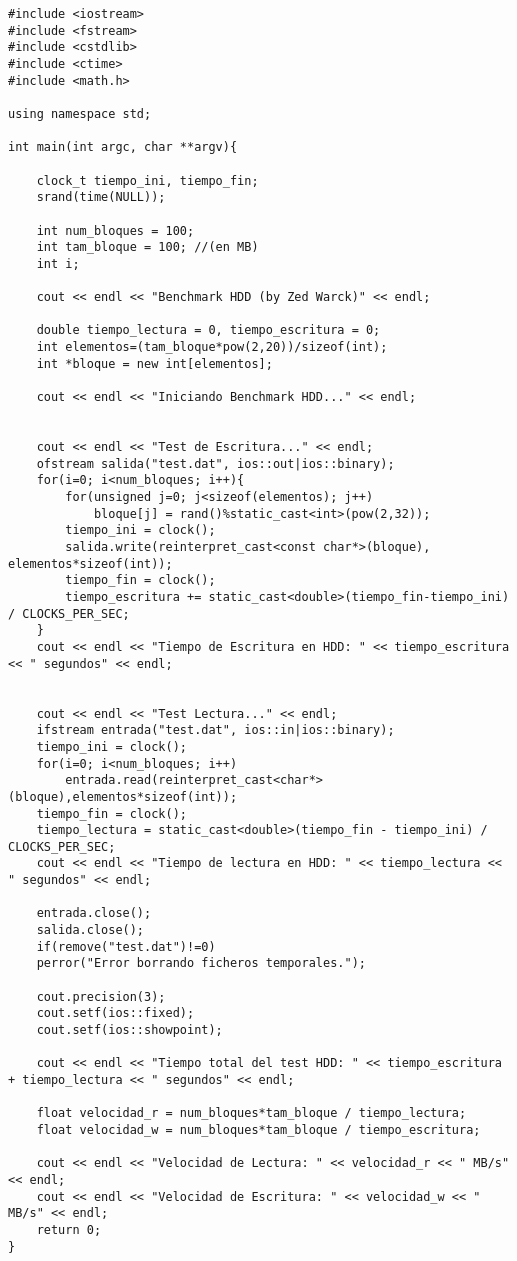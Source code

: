 \begin{lstlisting}[style=C]
#include <iostream>
#include <fstream>
#include <cstdlib>
#include <ctime>
#include <math.h>

using namespace std;

int main(int argc, char **argv){

	clock_t tiempo_ini, tiempo_fin;
	srand(time(NULL));

	int num_bloques = 100;
	int tam_bloque = 100; //(en MB)
	int i;

	cout << endl << "Benchmark HDD (by Zed Warck)" << endl;

	double tiempo_lectura = 0, tiempo_escritura = 0;
	int elementos=(tam_bloque*pow(2,20))/sizeof(int);
	int *bloque = new int[elementos];

	cout << endl << "Iniciando Benchmark HDD..." << endl;


	cout << endl << "Test de Escritura..." << endl;
	ofstream salida("test.dat", ios::out|ios::binary);
	for(i=0; i<num_bloques; i++){
		for(unsigned j=0; j<sizeof(elementos); j++)
			bloque[j] = rand()%static_cast<int>(pow(2,32));
		tiempo_ini = clock();
		salida.write(reinterpret_cast<const char*>(bloque), elementos*sizeof(int));
		tiempo_fin = clock();
		tiempo_escritura += static_cast<double>(tiempo_fin-tiempo_ini) / CLOCKS_PER_SEC;
	}
	cout << endl << "Tiempo de Escritura en HDD: " << tiempo_escritura << " segundos" << endl;
	
	
	cout << endl << "Test Lectura..." << endl;
	ifstream entrada("test.dat", ios::in|ios::binary);
	tiempo_ini = clock();
	for(i=0; i<num_bloques; i++)
		entrada.read(reinterpret_cast<char*>(bloque),elementos*sizeof(int));
	tiempo_fin = clock();
	tiempo_lectura = static_cast<double>(tiempo_fin - tiempo_ini) / CLOCKS_PER_SEC;
	cout << endl << "Tiempo de lectura en HDD: " << tiempo_lectura << " segundos" << endl;
	
	entrada.close();
	salida.close();
	if(remove("test.dat")!=0)
	perror("Error borrando ficheros temporales.");
	
	cout.precision(3);
	cout.setf(ios::fixed);
	cout.setf(ios::showpoint);

	cout << endl << "Tiempo total del test HDD: " << tiempo_escritura + tiempo_lectura << " segundos" << endl;
	
	float velocidad_r = num_bloques*tam_bloque / tiempo_lectura;
	float velocidad_w = num_bloques*tam_bloque / tiempo_escritura;
	
	cout << endl << "Velocidad de Lectura: " << velocidad_r << " MB/s" << endl;
	cout << endl << "Velocidad de Escritura: " << velocidad_w << " MB/s" << endl;
	return 0;
}


\end{lstlisting}

\clearpage


